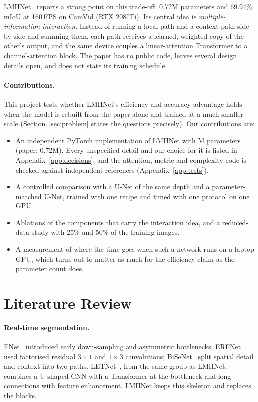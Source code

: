 \documentclass{article}
\begin{document}
LMIINet~\cite{qiu2024lmiinet} reports a strong point on this trade-off: 0.72M parameters and
69.94\% mIoU at 160\,FPS on CamVid (RTX 2080Ti). Its central idea is \emph{multiple-information
interaction}. Instead of running a local path and a context path side by side and summing them,
each path receives a learned, weighted copy of the other's output, and the same device couples a
linear-attention Transformer to a channel-attention block. The paper has no public code, leaves
several design details open, and does not state its training schedule.

\paragraph{Contributions.} This project tests whether LMIINet's efficiency and accuracy advantage
holds when the model is rebuilt from the paper alone and trained at a much smaller scale
(Section~\ref{sec:problem} states the questions precisely). Our contributions are:
\begin{itemize}
  \item An independent PyTorch implementation of LMIINet with \LmiiParams{}M parameters (paper:
        0.72M). Every unspecified detail and our choice for it is listed in
        Appendix~\ref{app:decisions}, and the attention, metric and complexity code is checked
        against independent references (Appendix~\ref{app:tests}).
  \item A controlled comparison with a U-Net of the same depth and a parameter-matched U-Net,
        trained with one recipe and timed with one protocol on one GPU.
  \item Ablations of the components that carry the interaction idea, and a reduced-data study
        with 25\% and 50\% of the training images.
  \item A measurement of where the time goes when such a network runs on a laptop GPU, which
        turns out to matter as much for the efficiency claim as the parameter count does.
\end{itemize}

\section{Literature Review}
\label{sec:related}

\paragraph{Real-time segmentation.} ENet~\cite{paszke2016enet} introduced early down-sampling and
asymmetric bottlenecks; ERFNet~\cite{romera2018erfnet} used factorised residual $3{\times}1$ and
$1{\times}3$ convolutions; BiSeNet~\cite{yu2018bisenet} split spatial detail and context into two
paths. LETNet~\cite{xu2023letnet}, from the same group as LMIINet, combines a U-shaped CNN with a
Transformer at the bottleneck and long connections with feature enhancement. LMIINet keeps this
skeleton and replaces the blocks.
\end{document}
